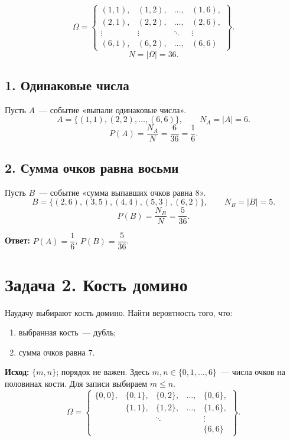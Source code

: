 \[
  \Omega=\left\{
  \begin{array}{cccc}
    (1,1), & (1,2), & \ldots, & (1,6),\\
    (2,1), & (2,2), & \ldots, & (2,6),\\
    \vdots & \vdots & \ddots & \vdots\\
    (6,1), & (6,2), & \ldots, & (6,6)
  \end{array}
  \right\}.
\]
\[
  N=|\Omega|=36.
\]

\newpage

\subsection*{1. Одинаковые числа}

Пусть $A$~--- событие «выпали одинаковые числа».
\[
  A=\{(1,1),(2,2),\ldots,(6,6)\},
  \qquad N_A=|A|=6.
\]
\[
  P(A)=\frac{N_A}{N}=\frac{6}{36}=\frac{1}{6}.
\]

\subsection*{2. Сумма очков равна восьми}

Пусть $B$~--- событие «сумма выпавших очков равна $8$».
\[
  B=\{(2,6),(3,5),(4,4),(5,3),(6,2)\},
  \qquad N_B=|B|=5.
\]
\[
  P(B)=\frac{N_B}{N}=\frac{5}{36}.
\]

\textbf{Ответ:} $P(A)=\dfrac{1}{6}$, $P(B)=\dfrac{5}{36}$.

\section*{Задача 2. Кость домино}

Наудачу выбирают кость домино. Найти вероятность того, что:
\begin{enumerate}
  \item выбранная кость~--- дубль;
  \item сумма очков равна $7$.
\end{enumerate}

\textbf{Исход:} $\{m,n\}$; порядок не важен.
Здесь $m,n\in\{0,1,\ldots,6\}$~--- числа очков на половинах кости.
Для записи выбираем $m\leq n$.
\[
  \Omega=\left\{
  \begin{array}{ccccc}
    \{0,0\}, & \{0,1\}, & \{0,2\}, & \ldots, & \{0,6\},\\
             & \{1,1\}, & \{1,2\}, & \ldots, & \{1,6\},\\
             &           & \ddots   &         & \vdots\\
             &           &          &         & \{6,6\}
  \end{array}
  \right\}.
\]

